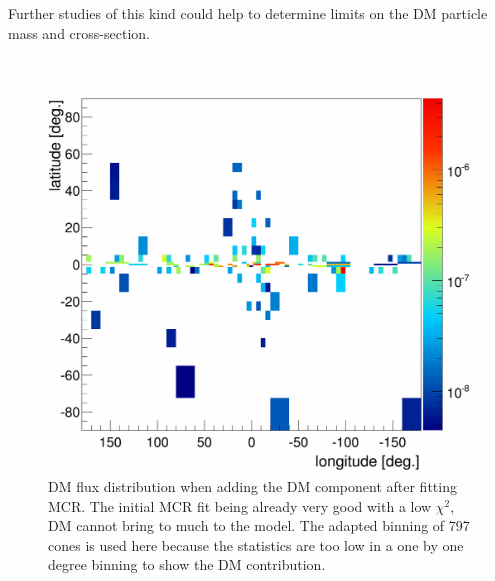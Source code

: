 Further studies of this kind could help to determine limits on the DM particle mass and cross-section.
\begin{figure}[H]
	\centering
	\includegraphics[width=.5\linewidth]{pic/discussion/DMlate_DM_distribution.png}
	\caption[DM distribution after fitting a MCR excess]{DM flux distribution when adding the DM component after fitting MCR. The initial MCR fit being already very good with a low $\chi^2$, DM cannot bring to much to the model. The adapted binning of 797 cones is used here because the statistics are too low in a one by one degree binning to show the DM contribution.}
	\label{fig:DMlate_distribution}
\end{figure}





